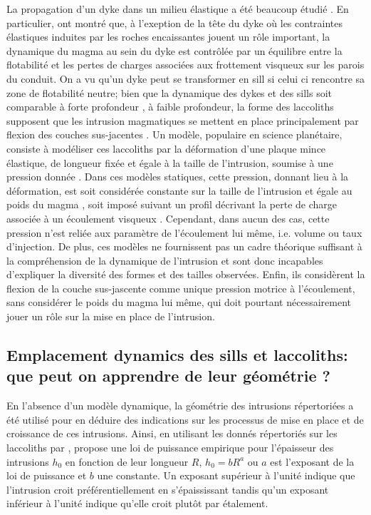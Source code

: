 La  propagation d'un  dyke dans  un  milieu élastique  a été  beaucoup
étudié    \citep{Lister:1991ut,Rubin:1995upa}.      En    particulier,
\citet{Lister:1991ut} ont montré que, à  l'exeption de la tête du dyke
où  les contraintes  élastiques induites  par les  roches encaissantes
jouent un  rôle important, la dynamique  du magma au sein  du dyke est
contrôlée  par un  équilibre entre  la  flotabilité et  les pertes  de
charges associées aux  frottement visqueux sur les  parois du conduit.
On a vu qu'un  dyke peut se transformer en sill  si celui ci rencontre
sa zone de flotabilité neutre; bien  que la dynamique des dykes et des
sills       soit       comparable       à       forte       profondeur
\citep{Lister:1991ut,Cruden:tg},  à faible  profondeur,  la forme  des
laccoliths supposent que les intrusion magmatiques se mettent en place
principalement     par     flexion    des     couches     sus-jacentes
\citep{Johnson:1973ho}.  Un  modèle, populaire en  science planétaire,
consiste à  modéliser ces laccoliths  par la déformation  d'une plaque
mince  élastique,  de   longueur  fixée  et  égale  à   la  taille  de
l'intrusion,  soumise à  une  pression donnée  \citep{Pollard:1973ho}.
Dans  ces  modèles  statiques,  cette  pression,  donnant  lieu  à  la
déformation,  est   soit  considérée   constante  sur  la   taille  de
l'intrusion      et       égale      au      poids       du      magma
\citep{Pollard:1973ho,Wichman:1996bj,Jozwiak:2012dq},    soit   imposé
suivant  un  profil  décrivant  la  perte  de  charge  associée  à  un
écoulement visqueux \citep{Kerr:1998eo,Wohler:2009jj}. Cependant, dans
aucun  des  cas,   cette  pression  n’est  reliée   aux  paramètre  de
l’écoulement lui même, i.e. volume  ou taux d’injection.  De plus, ces
modèles  ne  fournissent  pas  un   cadre  théorique  suffisant  à  la
compréhension de la  dynamique de l'intrusion et  sont donc incapables
d'expliquer la diversité  des formes et des  tailles observées. Enfin,
ils  considèrent la  flexion de  la couche  sus-jascente comme  unique
pression motrice à l'écoulement, sans considérer le poids du magma lui
même, qui  doit pourtant nécessairement jouer  un rôle sur la  mise en
place de l'intrusion.

\subsection{Emplacement dynamics des sills  et laccoliths: que peut on
  apprendre de leur géométrie ?}
\label{sec:empl-dynam-des}

En  l'absence  d'un  modèle  dynamique, la  géométrie  des  intrusions
répertoriées a  été utilisé  pour en déduire  des indications  sur les
processus de mise en place et de croissance de ces intrusions.  Ainsi,
en   utilisant  les   donnés  répertoriés   sur  les   laccoliths  par
\citet{E:2015tl},   \citet{McCaffrey:1997ea}   propose  une   loi   de
puissance empirique pour l'épaisseur  des intrusions $h_0$ en fonction
de leur longueur $R$, $h_0 = bR^a$  ou $a$ est l'exposant de la loi de
puissance  et $b$  une  constante.  Un  exposant  supérieur à  l'unité
indique  que l'intrusion  croit  préférentiellement en  s'épaississant
tandis qu'un exposant inférieur à l'unité indique qu'elle croit plutôt
par étalement.


